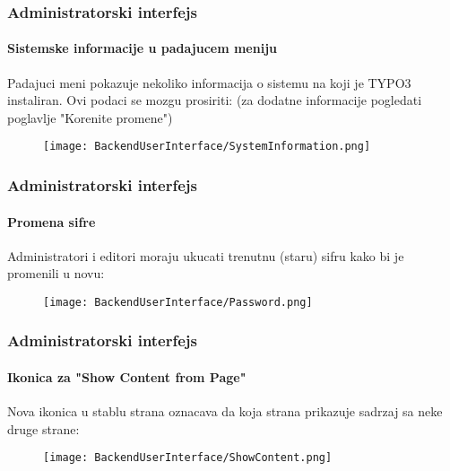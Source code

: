 \begin{frame}[fragile]
	\frametitle{Administratorski interfejs}
	\framesubtitle{Sistemske informacije u padajucem meniju}

	Padajuci meni pokazuje nekoliko informacija o sistemu na koji je TYPO3 instaliran.
	Ovi podaci se mozgu prosiriti:\newline
	\small(za dodatne informacije pogledati poglavlje "Korenite promene")\normalsize

	\begin{figure}
		\texttt{[image: BackendUserInterface/SystemInformation.png]}
	\end{figure}

\end{frame}

\begin{frame}[fragile]
	\frametitle{Administratorski interfejs}
	\framesubtitle{Promena sifre}

	Administratori i editori moraju ukucati trenutnu (staru) sifru kako bi je promenili u novu:

	\begin{figure}
		\texttt{[image: BackendUserInterface/Password.png]}
	\end{figure}

\end{frame}

\begin{frame}[fragile]
	\frametitle{Administratorski interfejs}
	\framesubtitle{Ikonica za "Show Content from Page"}

	Nova ikonica u stablu strana oznacava da koja strana prikazuje sadrzaj sa neke druge strane:

	\begin{figure}
		\texttt{[image: BackendUserInterface/ShowContent.png]}
	\end{figure}

\end{frame}

